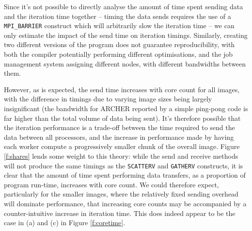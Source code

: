 \documentclass{article} %
\begin{document}
Since it's not possible to directly analyse the amount of time spent sending data and the iteration time together -- timing the data sends requires the use of a \texttt{MPI\_BARRIER} construct which will arbitrarily slow the iteration time -- we can only estimate the impact of the send time on iteration timings. Similarly, creating two different versions of the program does not guarantee reproducibility, with both the compiler potentially performing different optimisations, and the job management system assigning different nodes, with different bandwidths between them.

However, as is expected, the send time increases with core count for all images, with the difference in timings due to varying image sizes being largely insignificant (the bandwidth for ARCHER reported by a simple ping-pong code is far higher than the total volume of data being sent).
It's therefore possible that the iteration performance is a trade-off between the time required to send the data between all processors, and the increase in performance made by having each worker compute a progressively smaller chunk of the overall image.
Figure \ref{f:shares} lends some weight to this theory: while the send and receive methods will not produce the same timings as the \texttt{SCATTERV} and \texttt{GATHERV} constructs, it is clear that the amount of time spent performing data transfers, as a proportion of program run-time, increases with core count. We could therefore expect, particularly for the smaller images, where the relatively fixed sending overhead will dominate performance, that increasing core counts may be accompanied by a counter-intuitive increase in iteration time.
This does indeed appear to be the case in (a) and (c) in Figure \ref{f:coretime}.
\end{document}
